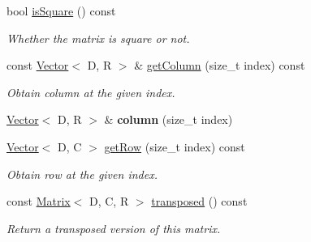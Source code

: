 \begin{Indent}
\begin{DoxyCompactItemize}
\mbox{\label{classrev_1_1_matrix_a0d601ef22d6cd045fa23b978f15f6af3}} 
bool \mbox{\hyperlink{classrev_1_1_matrix_a0d601ef22d6cd045fa23b978f15f6af3}{is\+Square}} () const
\begin{DoxyCompactList}\small\item\em Whether the matrix is square or not. \end{DoxyCompactList}\item 
\mbox{\label{classrev_1_1_matrix_a40ddf66e2af814bc2efb8dc3760e7090}} 
const \mbox{\hyperlink{classrev_1_1_vector}{Vector}}$<$ D, R $>$ \& \mbox{\hyperlink{classrev_1_1_matrix_a40ddf66e2af814bc2efb8dc3760e7090}{get\+Column}} (size\+\_\+t index) const
\begin{DoxyCompactList}\small\item\em Obtain column at the given index. \end{DoxyCompactList}\item 
\mbox{\label{classrev_1_1_matrix_a1b64cb2a08794869e61dfcabaa3ab02a}} 
\mbox{\hyperlink{classrev_1_1_vector}{Vector}}$<$ D, R $>$ \& {\bfseries column} (size\+\_\+t index)
\item 
\mbox{\label{classrev_1_1_matrix_a323c186a0bbf60a47b918cb27bfbaea0}} 
\mbox{\hyperlink{classrev_1_1_vector}{Vector}}$<$ D, C $>$ \mbox{\hyperlink{classrev_1_1_matrix_a323c186a0bbf60a47b918cb27bfbaea0}{get\+Row}} (size\+\_\+t index) const
\begin{DoxyCompactList}\small\item\em Obtain row at the given index. \end{DoxyCompactList}\item 
\mbox{\label{classrev_1_1_matrix_aafb4e418b6cb89f4c0d73bd126782ef2}} 
const \mbox{\hyperlink{classrev_1_1_matrix}{Matrix}}$<$ D, C, R $>$ \mbox{\hyperlink{classrev_1_1_matrix_aafb4e418b6cb89f4c0d73bd126782ef2}{transposed}} () const
\begin{DoxyCompactList}\small\item\em Return a transposed version of this matrix. \end{DoxyCompactList}\item 
\mbox{\label{classrev_1_1_matrix_a00221a77493da4c84afb88a1360c62d8}} 

\end{DoxyCompactItemize}
\end{Indent}
